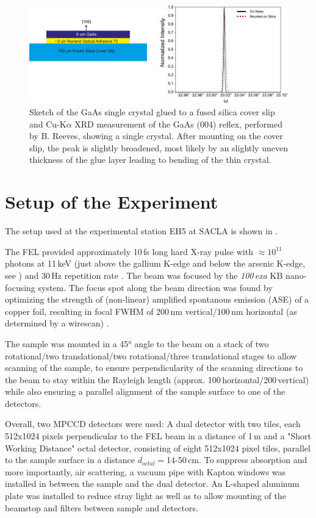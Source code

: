 \begin{figure}[tp]
	\centering
	\includegraphics[width=0.8\linewidth]{images/gaas_sample.pdf}
	\caption[GaAs sample]{Sketch of the GaAs single crystal glued to a fused silica cover slip and Cu-K$\alpha$ XRD measurement of the GaAs (004) reflex, performed by B. Reeves, showing a single crystal. After mounting on the cover slip, the peak is slightly broadened, most likely by an slightly uneven thickness of the glue layer  leading to bending of the thin crystal.}
	\label{fig:gaas_sample}
\end{figure}

\FloatBarrier
\section{Setup of the Experiment}
The setup used at the experimental station EH5 at SACLA is shown in . 

The FEL provided approximately 10\,fs long hard X-ray pulse with $\approx 10^{11}$ photons at 11\,keV (just above the gallium K-edge and below the arsenic K-edge, see ) and 30\,Hz repetition rate \cite{tono2013}. The beam was focused by the \textit{100\,exa} KB nano-focusing system. The focus spot along the beam direction was found by optimizing the strength of (non-linear) amplified spontanous emission (ASE) of a copper foil, resulting in focal FWHM of 200\,nm vertical/100\,nm horizontal (as determined by a wirescan) \cite{yumoto2020,handa2010,yoneda2015}.

The sample was mounted in a 45° angle to the beam on a stack of two rotational/two translational/two rotational/three translational stages to allow scanning of the sample, to ensure perpendicularity of the scanning directions to the beam to stay within the Rayleigh length (approx. 100\,\micrometer horizontal/200\,\micrometer vertical) while also ensuring a parallel alignment of the sample surface to one of the detectors. 

Overall, two MPCCD detectors were used: A dual detector with two tiles, each 512x1024 pixels perpendicular to the FEL beam in a distance of 1\,m and a "Short Working Distance" octal detector, consisting of eight 512x1024 pixel tiles, parallel to the sample surface in a distance $d_{octal}=$14-50\,cm. To suppress absorption and more importantly, air scattering, a vacuum pipe with Kapton windows was installed in between the sample and the dual detector.
An L-shaped aluminum plate was installed to reduce stray light as well as to allow mounting of the beamstop and filters between sample and detectors.

